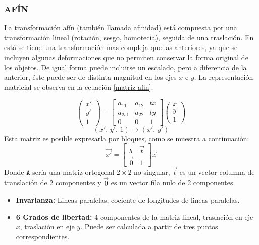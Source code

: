 \subsubsection*{AFÍN}

La transformación afín (también llamada afinidad) está compuesta por una transformación lineal (rotación, sesgo, homotecia), seguida de una traslación. En está se tiene una transformación mas compleja que las anteriores, ya que se incluyen algunas deformaciones que no permiten conservar la forma original de los objetos. De igual forma puede incluirse un escalado, pero a diferencia de la anterior, éste puede ser de distinta magnitud en los ejes $x$ e $y$. La representación matricial se observa en la ecuación \ref{matriz-afin}.

\begin{equation}
\begin{pmatrix}
{x'}\\{y'}\\{1}
\end{pmatrix} = 
\begin{bmatrix}
{a_{11}}&{a_{12}}&{tx}\\
{a_{2s1}}&{a_{22}}&{ty}\\
{0}&{0}&{1}
\end{bmatrix}
\begin{pmatrix}
{x}\\{y}\\{1}
\end{pmatrix}
\label{matriz-afin}
\end{equation}
\begin{displaymath}
(x', \,y', \,1) \to (x',\, y')
\end{displaymath}
Esta matriz es posible expresarla por bloques, como se muestra a continuación:
\begin{displaymath}
\vec{x'}= 
\begin{bmatrix}
{\mathtt{A}}&{\vec{t}}\\
{\vec{0}}&{1}
\end{bmatrix}
\vec{x}
\label{bloque-afin}
\end{displaymath}
Donde $ \mathtt{A} $ sería una matriz ortogonal $2\times2$ no singular, $\vec{t} $ es un vector columna de translación de 2 componentes y $\vec{0} $ es un vector fila nulo de 2 componentes.

\begin{itemize}
	\item \textbf{Invarianza:} Lineas paralelas, cociente de longitudes de lineas paralelas.
	\item \textbf{6 Grados de libertad:} 4 componentes de la matriz lineal, traslación en eje $x$, traslación en eje $y$. Puede ser calculada a partir de tres puntos correspondientes.
\end{itemize}

